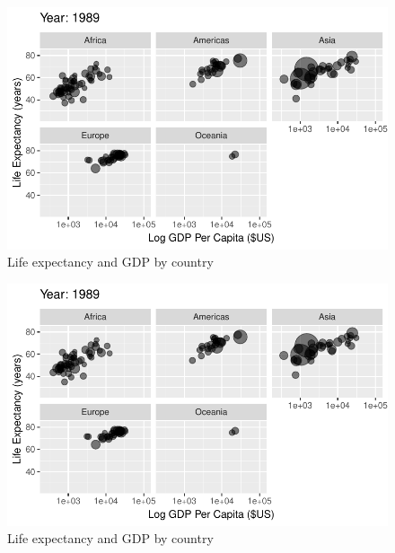 \documentclass[
  letterpaper,
  DIV=11,
  numbers=noendperiod]{scrreport}
\theoremstyle{definition}
\theoremstyle{remark}
\begin{document}
\begin{figure}

{\centering \includegraphics{index_files/figure-pdf/fig-anim-lifegdp-67.pdf}

}

\caption{\label{fig-anim-lifegdp-67}Life expectancy and GDP by country}

\end{figure}

\begin{figure}

{\centering \includegraphics{index_files/figure-pdf/fig-anim-lifegdp-68.pdf}

}

\caption{\label{fig-anim-lifegdp-68}Life expectancy and GDP by country}

\end{figure}
\end{document}
